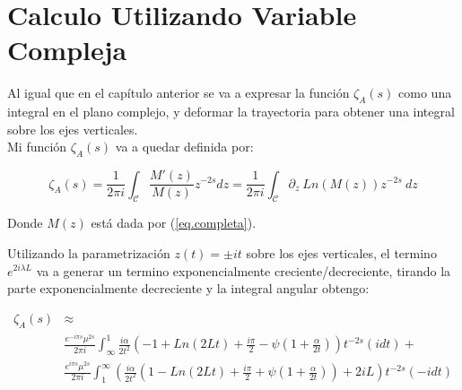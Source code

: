 \section{Calculo Utilizando Variable Compleja}


Al igual que en el capítulo anterior se va a expresar la función $\zeta _A (s)$ como una integral en el plano complejo, y deformar la trayectoria para obtener una integral sobre los ejes verticales. \\

Mi función $ \zeta _A (s) $ va a quedar definida por:

\begin{equation}
\zeta _A (s) = 
\frac{1}{2 \pi i} 
\int _{\mathcal{C}}
\frac{M ' ( z ) }{ M ( z ) } z ^{-2s} d z = 
\frac{1}{2 \pi i} 
\int _{\mathcal{C}}
\partial _z \ Ln (	M(z) ) z ^{-2s} \ dz
\label{eq.zeta.compleja}
\end{equation}

Donde $M ( z )$ está dada por (\ref{eq.completa}).

Utilizando la parametrización $ z (t) = \pm i t$ sobre los ejes verticales, el termino $e ^{2 i \lambda L}$ va a generar un termino exponencialmente creciente/decreciente, tirando la parte exponencialmente decreciente y la integral angular obtengo:

\begin{comment}

\begin{equation}
\begin{array}{c}
    \zeta _A (s) = \\
     \frac{1}{2 \pi i} \int _{\infty} ^{1}
     \frac{ i \alpha }{2 t^2} 
     \left(
      1 + \frac{i \pi}{2} + Ln[2 t] + \psi (1 + \frac{\beta}{2 t})
     \right)
     t ^{-2s}
     e ^{- i \pi s} (i dt) + \\
     \frac{1}{2 \pi i} \int _{\infty} ^{1} 
     \left(
     2 + \frac{\beta}{2 t^2}
     \left(
     1 + \frac{i \pi}{2} - Ln[2 t] - \psi (1+ \frac{\beta}{2 t})
     \right)
     t ^{-2s}
     e ^{ i \pi s} (-i dt)
     \right)     
\end{array}
\end{equation}

\end{comment}

\begin{align}
    \zeta _A (s) &\approx \\
     & \frac{e^{-i \pi s} \mu ^{2s}}{2 \pi i} \int _{\infty} ^{1}
     \frac{ i \alpha}{2 t^2}
     \left(
     - 1 + Ln(2 L t) + \frac{i \pi}{2}  - \psi (1+\frac{\alpha}{2 t})
     \right)
     t^{-2 s}
      \nonumber
     (i dt) + \\
     & \frac{e^{i \pi s} \mu ^{2s}}{2 \pi i} \int _1 ^{\infty}
	\left(      
     \frac{ i \alpha}{2  t^2}
     \left(
     1 - Ln(2 L t) + \frac{i \pi}{2} + \psi (1 + \frac{\alpha}{2 t})       
     \right)
     + 2 i L
     \right)
     t^{-2 s}
     (-i dt) \nonumber
\end{align}


